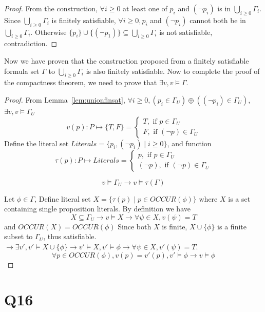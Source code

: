 \documentclass{article}
\newtheorem{lemma}[theorem]{Lemma}
\let\oldlemma\lemma
\let\endoldlemma\endlemma
\renewenvironment{lemma}
  {\begin{tcolorbox}[
      colback=green!8,
      colframe=green!50!black,
      boxrule=0.6pt,
      arc=2pt,
      left=6pt,right=6pt,top=4pt,bottom=4pt
    ]\oldlemma}
  {\endoldlemma\end{tcolorbox}}
\begin{document}
\begin{proof}
    From the construction, $\forall i \geq 0$ at least one of $p_i$ and $(\neg p_i)$ is in $\bigcup_{i\geq 0} \Gamma_i$. Since $\bigcup_{i\geq 0} \Gamma_i$ is finitely satisfiable, 
    $\forall i \geq 0, p_i$ and $(\neg p_i)$ cannot both be in $\bigcup_{i\geq 0} \Gamma_i$. Otherwise $\{p_i\} \cup \{(\neg p_1)\} \subseteq \bigcup_{i\geq 0} \Gamma_i$ is not satisfiable, contradiction.
\end{proof}
Now we have proven that the construction proposed from a finitely satisfiable formula set $\Gamma$ to $\bigcup_{i\geq 0} \Gamma_i$ is also finitely satisfiable. Now to complete the proof of
the compactness theorem, we need to prove that $\exists v, v\models \Gamma$.
\begin{proof}
    From Lemma~\ref{lem:unionfinsat}, 
    $\forall i\geq 0, (p_i \in \Gamma_U) 
    \oplus ((\neg p_i) \in \Gamma_U)$, $\exists v, v \models \Gamma_U$
    \[v(p):P \mapsto \{T, F\} = \begin{cases}
        T, \text{ if } p \in \Gamma_U\\
        F, \text{ if } (\neg p) \in \Gamma_U
    \end{cases}\]
    Define the literal set $Literals = \{p_i, (\neg p_i) \mid i \geq 0\}$, 
    and function 
    \[\tau(p): P \mapsto Literals = \begin{cases}
        p, \text{ if } p \in \Gamma_U\\
        (\neg p), \text{ if } (\neg p) \in \Gamma_U
    \end{cases}\]
    \begin{lemma}
        \[v\models \Gamma_U \rightarrow v \models \tau(\Gamma)\]
    \end{lemma}
    Let $\phi \in \Gamma$, Define literal set $X = \{\tau(p) \mid p \in OCCUR(\phi)\}$
    where $X$ is a set containing single proposition literals. 
    By definition we have 
    \[X \subseteq \Gamma_U \rightarrow v \models X \rightarrow \forall \psi \in X, v(\psi) = T\]
    and $OCCUR(X) = OCCUR(\phi)$
    Since both $X$ is finite, $X \cup \{\phi\}$ is a finite subset to $\Gamma_U$, thus satisfiable. 
    $\rightarrow \exists v', v' \models X\cup \{\phi\} \rightarrow v' \models X, v' \models \phi \rightarrow
    \forall \psi \in X, v'(\psi) = T$. 
    \[\forall p \in OCCUR(\phi), v(p) = v'(p), v' \models \phi \rightarrow v\models \phi\]
\end{proof}


\section*{Q16}
\end{document}
